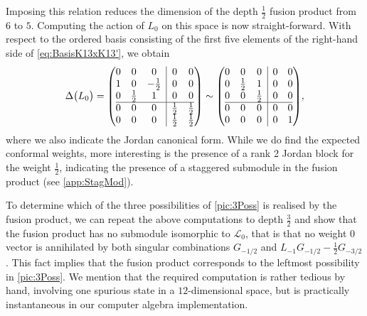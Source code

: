 \documentclass[a4paper,reqno,12pt]{report}
\makeatletter
\theoremstyle{definition}
\numberwithin{equation}{section}
\newenvironment{amatrix}[1]{\left( \begin{array}{@{}#1@{}}}{\end{array} \right)}
\let\originalleft\left     %
\let\originalright\right
\renewcommand{\left}{\mathopen{}\mathclose\bgroup\originalleft}
\renewcommand{\right}{\aftergroup\egroup\originalright}
\newcommand{\Irr}[1]{\mathcal{L}_{#1}}       %
\newcommand{\coproductsymb}{\Delta}                                                %
\newcommand{\coproduct}[1]{\coproductsymb \bigl( #1 \bigr)}                        %
\newcommand{\rhs}{right-hand side}
\theoremstyle{plain}
\makeatother
\begin{document}
Imposing this relation reduces the dimension of the depth $\frac{1}{2}$ fusion product from $6$ to $5$.  Computing the action of $L_0$ on this space is now straight-forward.  With respect to the ordered basis consisting of the first five elements of the \rhs{} of \eqref{eq:BasisK13xK13'}, we obtain
\begin{equation}
\coproduct{L_0} = 
\begin{amatrix}{ccc|cc}
0 & 0           & 0            & 0           & 0           \\
1 & 0           & -\frac{1}{2} & 0           & 0           \\
0 & \frac{1}{2} & 1            & 0           & 0           \\
\hline
0 & 0           & 0            & \frac{1}{2} & \frac{1}{2} \\
0 & 0           & 0            & \frac{1}{2} & \frac{1}{2}
\end{amatrix}
\sim
\begin{amatrix}{ccc|cc}
0 & 0           & 0           & 0 & 0 \\
0 & \frac{1}{2} & 1           & 0 & 0 \\
0 & 0           & \frac{1}{2} & 0 & 0 \\
\hline
0 & 0           & 0           & 0 & 0 \\
0 & 0           & 0           & 0 & 1
\end{amatrix}
,
\end{equation}
where we also indicate the Jordan canonical form.  While we do find the expected conformal weights, more interesting is the presence of a rank 2 Jordan block for the weight $\frac{1}{2}$, indicating the presence of a staggered submodule in the fusion product (see \cref{app:StagMod}).

To determine which of the three possibilities of \eqref{pic:3Poss} is realised by the fusion product, we can repeat the above computations to depth $\frac{3}{2}$ and show that the fusion product has no submodule isomorphic to $\Irr{0}$, that is that no weight $0$ vector is annihilated by both singular combinations $G_{-1/2}$ and $L_{-1} G_{-1/2} - \frac{1}{2} G_{-3/2}$.  This fact implies that the fusion product corresponds to the leftmost possibility in \eqref{pic:3Poss}.  We mention that the required computation is rather tedious by hand, involving one spurious state in a $12$-dimensional space, but is practically instantaneous in our computer algebra implementation.
\end{document}
